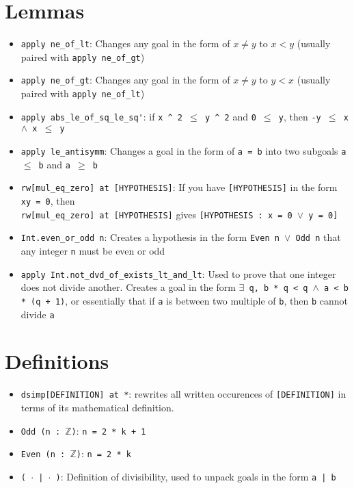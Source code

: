 \documentclass{exam}
\newcommand{\ZZ}{\mathbb Z}
\begin{document}
    \section*{Lemmas}
    \begin{itemize}
        \item \verb|apply ne_of_lt|: Changes any goal in the form of $x \neq y$ to $x < y$ (usually paired with \verb|apply ne_of_gt|)
        \item \verb|apply ne_of_gt|: Changes any goal in the form of $x \neq y$ to $y < x$ (usually paired with \verb|apply ne_of_lt|)
        \item \verb|apply abs_le_of_sq_le_sq'|: if \texttt{x \^{} 2 $\leq$ y \^{} 2} and \texttt{0 $\leq$ y}, then \texttt{-y $\leq$ x $\land$ x $\leq$ y}
        \item \verb|apply le_antisymm|: Changes a goal in the form of \texttt{a = b} into two subgoals \texttt{a $\leq$ b} and \texttt{a $\geq$ b}
        \item \verb|rw[mul_eq_zero] at [HYPOTHESIS]|: If you have \texttt{[HYPOTHESIS]} in the form \texttt{xy = 0}, then \\ \verb|rw[mul_eq_zero] at [HYPOTHESIS]| gives \texttt{[HYPOTHESIS : x = 0 $\lor$ y = 0]}
        \item \verb|Int.even_or_odd n|: Creates a hypothesis in the form \texttt{Even n $\lor$ Odd n} that any integer \texttt{n} must be even or odd
        \item \verb|apply Int.not_dvd_of_exists_lt_and_lt|: Used to prove that one integer does not divide another. Creates a goal in the form \texttt{$\exists$ q, b * q < q $\land$ a < b * (q + 1)}, or essentially that if \texttt{a} is between two multiple of \texttt{b}, then \texttt{b} cannot divide \texttt{a}
    \end{itemize}

    \section*{Definitions}
    \begin{itemize}
        \item \verb|dsimp[DEFINITION] at *|: rewrites all written occurences of \texttt{[DEFINITION]} in terms of its mathematical definition.
        \item \texttt{Odd (n : $\ZZ$)}: \texttt{n = 2 * k + 1}
        \item \texttt{Even (n : $\ZZ$)}: \texttt{n = 2 * k}
        \item \texttt{( $\cdot$ | $\cdot$ )}: Definition of divisibility, used to unpack goals in the form \texttt{a | b}
    \end{itemize}
\end{document}

